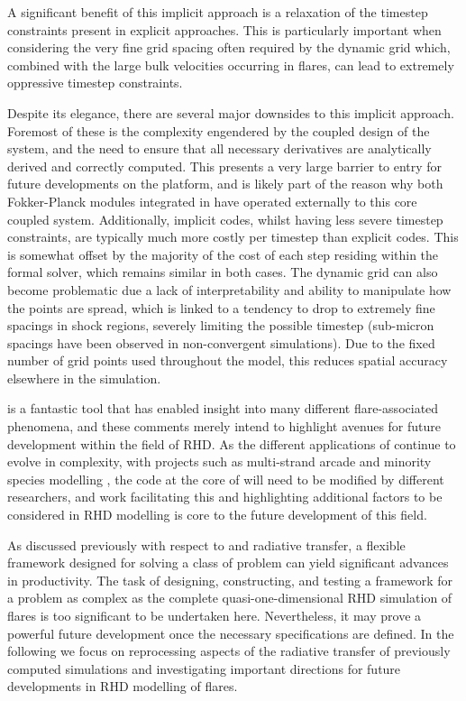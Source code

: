 A significant benefit of this implicit approach is a relaxation of the timestep constraints present in explicit approaches.
This is particularly important when considering the very fine grid spacing often required by the dynamic grid which, combined with the large bulk velocities occurring in flares, can lead to extremely oppressive timestep constraints.

Despite its elegance, there are several major downsides to this implicit approach.
Foremost of these is the complexity engendered by the coupled design of the system, and the need to ensure that all necessary derivatives are analytically derived and correctly computed.
This presents a very large barrier to entry for future developments on the platform, and is likely part of the reason why both Fokker-Planck modules integrated in \Radyn{} have operated externally to this core coupled system.
Additionally, implicit codes, whilst having less severe timestep constraints, are typically much more costly per timestep than explicit codes.
This is somewhat offset by the majority of the cost of each step residing within the formal solver, which remains similar in both cases.
The dynamic grid can also become problematic due a lack of interpretability and ability to manipulate how the points are spread, which is linked to a tendency to drop to extremely fine spacings in shock regions, severely limiting the possible timestep (sub-micron spacings have been observed in non-convergent simulations).
Due to the fixed number of grid points used throughout the model, this reduces spatial accuracy elsewhere in the simulation.

\Radyn{} is a fantastic tool that has enabled insight into many different flare-associated phenomena, and these comments merely intend to highlight avenues for future development within the field of RHD.
As the different applications of \Radyn{} continue to evolve in complexity, with projects such as multi-strand arcade and minority species modelling \citep[e.g.][]{Kerr2019,Polito2019,Kerr2020}, the code at the core of \Radyn{} will need to be modified by different researchers, and work facilitating this and highlighting additional factors to be considered in RHD modelling is core to the future development of this field.

As discussed previously with respect to \Lw{} and radiative transfer, a flexible framework designed for solving a class of problem can yield significant advances in productivity.
The task of designing, constructing, and testing a framework for a problem as complex as the complete quasi-one-dimensional RHD simulation of flares is too significant to be undertaken here.
Nevertheless, it may prove a powerful future development once the necessary specifications are defined.
In the following we focus on reprocessing aspects of the radiative transfer of previously computed \Radyn{} simulations and investigating important directions for future developments in RHD modelling of flares.

